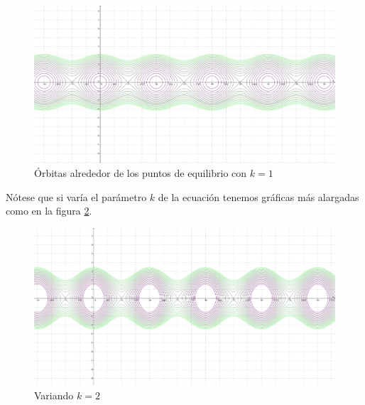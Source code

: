 \documentclass[10pt,letterpaper,titlepage]{article}
\begin{document}
\begin{figure}
	\includegraphics[width=\textwidth]{plot.png}
	\caption{Órbitas alrededor de los puntos de equilibrio con $k=1$}
	\label{fig:orbitas}
\end{figure}

Nótese que si varía el parámetro $k$ de la ecuación tenemos gráficas más alargadas como en la figura \ref{fig:orbitas_largas}.

\begin{figure}
	\includegraphics[width=\textwidth]{plot2.png}
	\caption{Variando $k=2$}
	\label{fig:orbitas_largas}
\end{figure}
\end{document}

